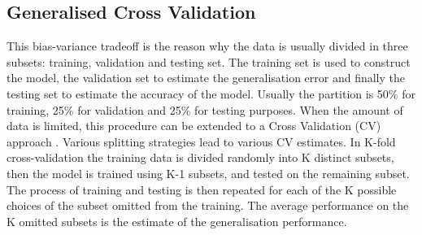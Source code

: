 \subsection{Generalised Cross Validation}
This bias-variance tradeoff is the reason why the 
data is usually divided in three subsets: training, validation and
testing set. The training set is used to construct the model, the validation set
to estimate the generalisation error and finally the testing set to estimate
the accuracy of the model. Usually the partition is 50\% for training, 25\%
for validation and 25\% for testing purposes. When the
amount of data is limited, this procedure can be extended to
a Cross Validation (CV) approach \cite{geisser1975} . Various splitting strategies lead to various CV
estimates. In K-fold cross-validation  \cite{stone1974} the training data is divided randomly into
K distinct subsets, then the model is trained using K-1 subsets, and tested on
the remaining subset. The process of training and testing is then repeated for
each of the K possible choices of the subset omitted from the training. The
average performance on the K omitted subsets is the estimate of the
generalisation performance.







